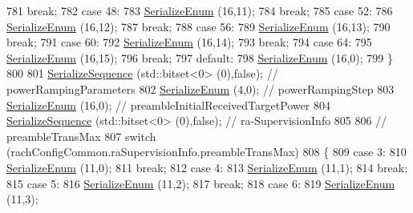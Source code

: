 \begin{DoxyCode}
781       \textcolor{keywordflow}{break};
782     \textcolor{keywordflow}{case} 48:
783       \hyperlink{classns3_1_1Asn1Header_ac8e56956823ab8e4470c09e162e7bf24}{SerializeEnum} (16,11);
784       \textcolor{keywordflow}{break};
785     \textcolor{keywordflow}{case} 52:
786       \hyperlink{classns3_1_1Asn1Header_ac8e56956823ab8e4470c09e162e7bf24}{SerializeEnum} (16,12);
787       \textcolor{keywordflow}{break};
788     \textcolor{keywordflow}{case} 56:
789       \hyperlink{classns3_1_1Asn1Header_ac8e56956823ab8e4470c09e162e7bf24}{SerializeEnum} (16,13);
790       \textcolor{keywordflow}{break};
791     \textcolor{keywordflow}{case} 60:
792       \hyperlink{classns3_1_1Asn1Header_ac8e56956823ab8e4470c09e162e7bf24}{SerializeEnum} (16,14);
793       \textcolor{keywordflow}{break};
794     \textcolor{keywordflow}{case} 64:
795       \hyperlink{classns3_1_1Asn1Header_ac8e56956823ab8e4470c09e162e7bf24}{SerializeEnum} (16,15);
796       \textcolor{keywordflow}{break};
797     \textcolor{keywordflow}{default}:
798       \hyperlink{classns3_1_1Asn1Header_ac8e56956823ab8e4470c09e162e7bf24}{SerializeEnum} (16,0);
799     \}
800 
801   \hyperlink{classns3_1_1Asn1Header_aa9744858380443ed95836fed08799aed}{SerializeSequence} (std::bitset<0> (0),\textcolor{keyword}{false}); \textcolor{comment}{// powerRampingParameters}
802   \hyperlink{classns3_1_1Asn1Header_ac8e56956823ab8e4470c09e162e7bf24}{SerializeEnum} (4,0); \textcolor{comment}{// powerRampingStep}
803   \hyperlink{classns3_1_1Asn1Header_ac8e56956823ab8e4470c09e162e7bf24}{SerializeEnum} (16,0); \textcolor{comment}{// preambleInitialReceivedTargetPower}
804   \hyperlink{classns3_1_1Asn1Header_aa9744858380443ed95836fed08799aed}{SerializeSequence} (std::bitset<0> (0),\textcolor{keyword}{false}); \textcolor{comment}{// ra-SupervisionInfo}
805 
806   \textcolor{comment}{// preambleTransMax}
807   \textcolor{keywordflow}{switch} (rachConfigCommon.raSupervisionInfo.preambleTransMax)
808     \{
809     \textcolor{keywordflow}{case} 3:
810       \hyperlink{classns3_1_1Asn1Header_ac8e56956823ab8e4470c09e162e7bf24}{SerializeEnum} (11,0);
811       \textcolor{keywordflow}{break};
812     \textcolor{keywordflow}{case} 4:
813       \hyperlink{classns3_1_1Asn1Header_ac8e56956823ab8e4470c09e162e7bf24}{SerializeEnum} (11,1);
814       \textcolor{keywordflow}{break};
815     \textcolor{keywordflow}{case} 5:
816       \hyperlink{classns3_1_1Asn1Header_ac8e56956823ab8e4470c09e162e7bf24}{SerializeEnum} (11,2);
817       \textcolor{keywordflow}{break};
818     \textcolor{keywordflow}{case} 6:
819       \hyperlink{classns3_1_1Asn1Header_ac8e56956823ab8e4470c09e162e7bf24}{SerializeEnum} (11,3);

\end{DoxyCode}
